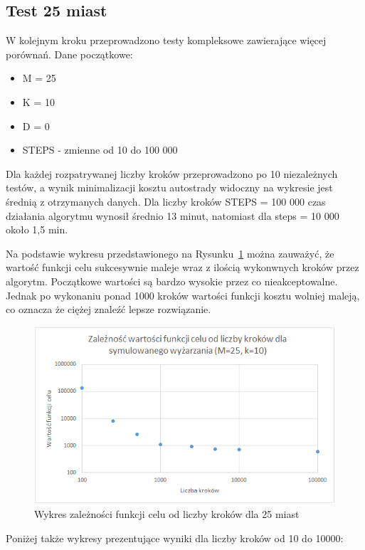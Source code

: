 \documentclass[a4paper]{article}
\begin{document}
\subsection{Test 25 miast}

W kolejnym kroku przeprowadzono testy kompleksowe zawierające więcej porównań. Dane początkowe:
\begin{itemize}
\item M = 25
\item K = 10
\item D = 0
\item STEPS - zmienne od 10 do 100 000
\end{itemize}
Dla każdej rozpatrywanej liczby kroków przeprowadzono po 10 niezależnych testów, a wynik minimalizacji kosztu autostrady widoczny na wykresie jest średnią z otrzymanych danych.
Dla liczby kroków STEPS = 100 000 czas działania algorytmu wynosił średnio 13 minut, natomiast dla steps = 10 000 około 1,5 min.\newline

Na podstawie wykresu przedstawionego na Rysunku~\ref{fig:wyk25} można zauważyć, że wartość funkcji celu sukcesywnie maleje wraz z ilością wykonwnych kroków przez algorytm. Początkowe wartości są bardzo wysokie przez co nieakceptowalne. Jednak po wykonaniu ponad 1000 kroków wartości funkcji kosztu wolniej maleją, co oznacza że ciężej znaleźć lepsze rozwiązanie.
\vskip 5cm
\begin{figure}[h!]
\centering
\includegraphics[width=12cm]{25_cities_wykres}
\caption{Wykres zależności funkcji celu od liczby kroków dla 25 miast}
\label{fig:wyk25}
\end{figure}
\vskip 1cm

Poniżej także wykresy prezentujące wyniki dla liczby kroków od 10 do 10000:
\end{document}
